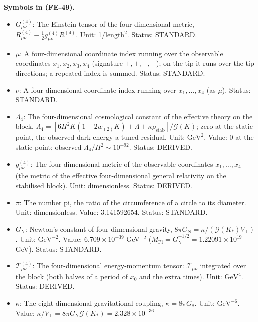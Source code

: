 \documentclass[
  10pt,
]{article}
\providecommand{\tightlist}{%
  \setlength{\itemsep}{0pt}\setlength{\parskip}{0pt}}
\begin{document}
\textbf{Symbols in (FE-49).}

\begin{itemize}
\tightlist
\item
  \(G^{(4)}_{\mu\nu}\): The Einstein tensor of the four-dimensional
  metric, \(R^{(4)}_{\mu\nu} - \frac12 g^{(4)}_{\mu\nu}R^{(4)}\). Unit:
  1/\(\mathrm{length}^{2}\). Status: STANDARD.
\item
  \(\mu\): A four-dimensional coordinate index running over the
  observable coordinates \(x_1, x_2, x_3, x_4\) (signature \(+,+,+,-\));
  on the tip it runs over the tip directions; a repeated index is
  summed. Status: STANDARD.
\item
  \(\nu\): A four-dimensional coordinate index running over
  \(x_1, \dots, x_4\) (as \(\mu\)). Status: STANDARD.
\item
  \(\Lambda_4\): The four-dimensional cosmological constant of the
  effective theory on the block,
  \(\Lambda_4 = [6H^2K(1 - 2w_{(2)}K) + \Lambda + \kappa\rho_{\mathrm{stab}}]/\mathcal{G}(K)\);
  zero at the static point, the observed dark energy a tuned residual.
  Unit: \(\mathrm{GeV}^{2}\). Value: 0 at the static point; observed
  \(\Lambda_4/H^2 \sim 10^{-92}\). Status: DERIVED.
\item
  \(g^{(4)}_{\mu\nu}\): The four-dimensional metric of the observable
  coordinates \(x_1, \dots, x_4\) (the metric of the effective
  four-dimensional general relativity on the stabilised block). Unit:
  dimensionless. Status: DERIVED.
\item
  \(\pi\): The number pi, the ratio of the circumference of a circle to
  its diameter. Unit: dimensionless. Value: 3.141592654. Status:
  STANDARD.
\item
  \(G_{\mathrm{N}}\): Newton's constant of four-dimensional gravity,
  \(8\pi G_{\mathrm{N}} = \kappa/(\mathcal{G}(K_*)V_\perp)\). Unit:
  \(\mathrm{GeV}^{-2}\). Value: \(6.709\times10^{-39}\) GeV\(^{-2}\)
  (\(M_{\mathrm{Pl}} = G_{\mathrm{N}}^{-1/2} = 1.22091\times10^{19}\)
  GeV). Status: STANDARD.
\item
  \(\mathcal{T}^{(4)}_{\mu\nu}\): The four-dimensional energy-momentum
  tensor: \(\mathcal{T}_{\mu\nu}\) integrated over the block (both
  halves of a period of \(x_0\) and the extra times). Unit:
  \(\mathrm{GeV}^{4}\). Status: DERIVED.
\item
  \(\kappa\): The eight-dimensional gravitational coupling,
  \(\kappa = 8\pi G_8\). Unit: \(\mathrm{GeV}^{-6}\). Value:
  \(\kappa/V_\perp = 8\pi G_{\mathrm{N}}\mathcal{G}(K_*) = 2.328\times10^{-36}\)

\end{itemize}
\end{document}
